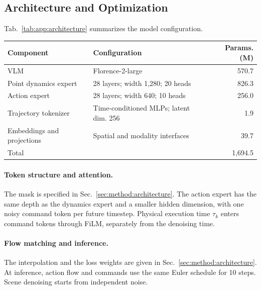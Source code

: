 \noindent\begin{minipage}{\linewidth}
\subsection{Architecture and Optimization}
\label{app:implementation}

Tab.~\ref{tab:app:architecture} summarizes the model configuration.

\begin{center}
    \makeatletter{}\makeatother
    \centering
    \small
    \setlength{\tabcolsep}{6pt}
    \renewcommand{\arraystretch}{1.12}
    \caption{Model architecture. Parameter counts include the frozen tokenizer.}
    \label{tab:app:architecture}
    \begin{tabular}{@{}llr@{}}
        \toprule
        Component & Configuration & Params. (M) \\
        \midrule
        VLM & Florence-2-large & 570.7 \\
        Point dynamics expert & 28 layers; width 1,280; 20 heads & 826.3 \\
        Action expert & 28 layers; width 640; 10 heads & 256.0 \\
        Trajectory tokenizer & Time-conditioned MLPs; latent dim. 256 & 1.9 \\
        Embeddings and projections & Spatial and modality interfaces & 39.7 \\
        \midrule
        Total & & 1,694.5 \\
        \bottomrule
    \end{tabular}
\end{center}
\end{minipage}


\paragraph{Token structure and attention.}
The mask is specified in Sec.~\ref{sec:method:architecture}.
The action expert has the same depth as the dynamics expert and a smaller
hidden dimension, with one noisy command token per future timestep.
Physical execution time $\tau_k$ enters command tokens through FiLM,
separately from the denoising time.

\paragraph{Flow matching and inference.}
The interpolation and the loss weights are given in
Sec.~\ref{sec:method:architecture}.
At inference, action flow and commands use the same Euler schedule for
10 steps. Scene denoising starts from independent noise.

